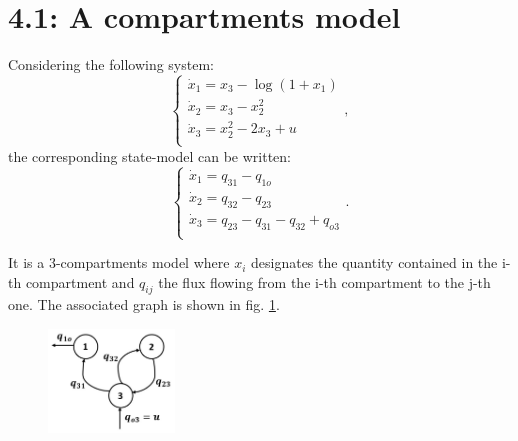 %
\graphicspath{{./TP4/}}


\section*{4.1: A compartments model}

Considering the following system:
\begin{equation}
\left\{
  \begin{array}{l}
  \dot{x}_1=x_3-\log(1+x_1)\\
  \dot{x}_2=x_3-x_2^2\\
  \dot{x}_3=x_2^2-2x_3+u\\
  \end{array} \right.,
\label{eq:system}
\end{equation}
the corresponding state-model can be written:
\begin{equation}
\left\{
  \begin{array}{l}
  \dot{x}_1=q_{31}-q_{1o}\\
  \dot{x}_2=q_{32}-q_{23}\\
  \dot{x}_3=q_{23}-q_{31}-q_{32}+q_{o3}\\
  \end{array} \right..
\label{eq:statemodel}
\end{equation}
 
 It is a 3-compartments model where $x_i$ designates the quantity contained in the i-th compartment and $q_{ij}$ the flux flowing from the i-th compartment to the j-th one. The associated graph is shown in fig. \ref{graphe}.
 
\begin{figure}[h!]
  \centering
  \includegraphics[width=0.3\textwidth]{graphe.JPG}
  \caption{}
  \label{graphe}
\end{figure}
 
